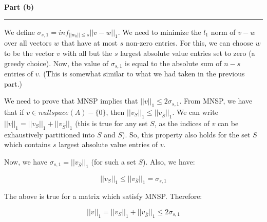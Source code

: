 \documentclass[a4paper,12pt]{article}
\newenvironment{solution}[2][]{%
    \begin{mdframed}[linecolor=blue!70!black, linewidth=2pt, roundcorner=10pt, backgroundcolor=yellow!10!white, skipabove=12pt, skipbelow=12pt]%
        \textbf{\large #2}
        \par\noindent\rule{\textwidth}{0.4pt}
}{
    \end{mdframed}
}
\begin{document}
\begin{solution}{Part (b)}
  We define $\sigma_{s,1} = inf_{||w_0|| \leq s}||v-w||_1$. We need to minimize the $l_1$ norm of $v-w$ over all vectors $w$ that have at most $s$ non-zero entries. For this, we can choose $w$ to be the vector $v$ with all but the $s$ largest absolute value entries set to zero (a greedy choice). Now, the value of $\sigma_{s,1}$ is equal to the absolute sum of $n-s$ entries of $v$. (This is somewhat similar to what we had taken in the previous part.)

  We need to prove that MNSP implies that $||v||_1 \leq 2\sigma_{s,1}$. From MNSP, we have that if $v \in nullspace(A) - \{0\}$, then $||v_S||_1 \leq ||v_{\bar{S}}||_1$. We can write $||v||_1 = ||v_S||_1 + ||v_{\bar{S}}||_1$ (this is true for any set $S$, as the indices of $v$ can be  exhaustively partitioned into $S$ and $\bar{S}$). So, this property also holds for the set $S$ which contains $s$ largest absolute value entries of $v$. 

  Now, we have $\sigma_{s,1} = ||v_{\bar{S}}||_1$ (for such a set $S$). Also, we have:

  \[
    ||v_S||_1 \leq ||v_{\bar{S}}||_1 = \sigma_{s,1}
  \]

  The above is true for a matrix which satisfy MNSP. Therefore:

  \[
    ||v||_1 = ||v_S||_1 + ||v_{\bar{S}}||_1 \leq 2\sigma_{s,1}
  \]
\end{solution}
\end{document}
